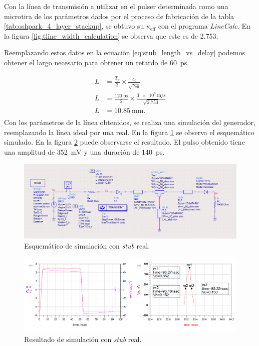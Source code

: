 Con la línea de transmisión a utilizar en el pulser determinada como una
microtira de los parámetros dados por el proceso de fabricación de la tabla
\ref{tab:oshpark_4_layer_stackup}, se obtuvo su $\kappa_{\text{eff}}$ con el
programa \textit{LineCalc}. En la figura \ref{fig:tline_width_calculation} se
observa que este es de \num{2.753}.

Reemplazando estos datos en la ecuación \ref{eq:stub_length_vs_delay} podemos
obtener el largo necesario para obtener un retardo de \qty{60}{\pico\second}.

\begin{equation}
    \begin{aligned}
        L &= \frac{T_p}{2} \times \frac{c_0}{\sqrt{\kappa_{\text{eff}}}} \\
        L &= \frac{\qty{120}{\pico\second}}{2} \times \frac{
            \qty{3e8}{\meter\per\second}}{\sqrt{2.753}} \\
        L &= \qty{10.85}{\milli\meter}. \\
    \end{aligned}
\end{equation}
Con los parámetros de la línea obtenidos, se realiza una simulación del
generador, reemplazando la línea ideal por una real. En la figura
\ref{fig:real_stub_simulation_sch} se observa el esquemático simulado. En la
figura \ref{fig:real_stub_simulation_result} puede observarse el resultado. El
pulso obtenido tiene una amplitud de \qty{352}{\milli\volt} y una duración de
\qty{140}{\pico\second}.

\begin{figure}[tbp]
    \centering
    \includegraphics[width=\textwidth]{images/real_stub_simulation_sch.png}
    \caption{Esquemático de simulación con \textit{stub} real.}
    \label{fig:real_stub_simulation_sch}
\end{figure}

\begin{figure}[tbp]
    \centering
    \includegraphics[width=\textwidth]{images/real_stub_simulation_result.png}
    \caption{Resultado de simulación con \textit{stub} real.}
    \label{fig:real_stub_simulation_result}
\end{figure}

